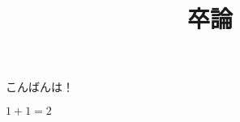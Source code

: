 \documentclass{jsarticle}
\title{卒論}
\theoremstyle{definition}
\begin{document}
\maketitle
こんばんは！

$1 + 1 = 2$
\end{document}
